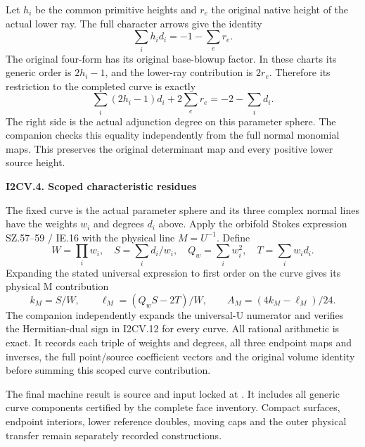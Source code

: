 Let \(h_i\) be the common primitive heights and \(r_e\) the original
native height of the actual lower ray. The full character arrows
give the identity
\[
                     \sum_i h_i d_i=-1-\sum_e r_e.
\tag{I2CV.10}
\]
The original four-form has its original base-blowup factor. In
these charts its generic order is \(2h_i-1\), and the lower-ray
contribution is \(2r_e\). Therefore its restriction to the completed
curve is exactly
\[
 \sum_i(2h_i-1)d_i+2\sum_e r_e=-2-\sum_i d_i.
\tag{I2CV.11}
\]
The right side is the actual adjunction degree on this parameter
sphere. The companion checks this equality independently from
the full normal monomial maps. This preserves the original
determinant map and every positive lower source height.

\par

\medskip\noindent\textbf{I2CV.4. Scoped characteristic residues}

\par\nobreak

The fixed curve is the actual parameter sphere and its three
complex normal lines have the weights \(w_i\) and degrees \(d_i\) above.
Apply the orbifold Stokes expression SZ.57--59 / IE.16 with the
physical line \(M=U^{-1}\). Define
\[
 W=\prod_i w_i,\quad S=\sum_i d_i/w_i,\quad
 Q_w=\sum_iw_i^2,\quad T=\sum_iw_id_i.
\]
Expanding the stated universal expression to first order on the
curve gives its physical M contribution
\[
               k_M=S/W,\qquad \ell_M=(Q_wS-2T)/W,
 \qquad A_M=(4k_M-\ell_M)/24.
\tag{I2CV.12}
\]
The companion independently expands the universal-U numerator
and verifies the Hermitian-dual sign in I2CV.12 for every curve.
All rational arithmetic is exact. It records each triple of
weights and degrees, all three endpoint maps and inverses, the
full point/source coefficient vectors and the original volume
identity before summing this scoped curve contribution.

The final machine result is source and input locked at
. It includes
all generic curve components certified by the complete face
inventory. Compact surfaces, endpoint interiors, lower reference
doubles, moving caps and the outer physical transfer remain
separately recorded constructions.






